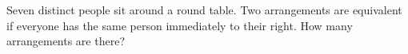 Seven distinct people sit around a round table. Two arrangements are equivalent if everyone has the same person immediately to their right. How many arrangements are there?
